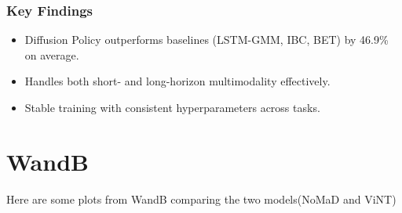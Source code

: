\documentclass[12pt]{article}
\begin{document}
\begin{appendices}
\subsubsection*{Key Findings}
\begin{itemize}
    \item Diffusion Policy outperforms baselines (LSTM-GMM, IBC, BET) by 46.9\% on average.
    \item Handles both short- and long-horizon multimodality effectively.
    \item Stable training with consistent hyperparameters across tasks.
\end{itemize}
\newpage
\section{WandB}
\label{app:wandb}
Here are some plots from WandB comparing the two models(NoMaD and ViNT)\\

\end{appendices}
\end{document}
